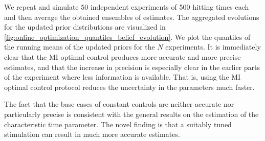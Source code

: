 We repeat and simulate $50$ independent experiments of 500 hitting times each and
then average the obtained ensembles of estimates.
The aggregated evolutions for the updated prior distributions are visualized in
\cref{fig:online_optimization_quantiles_belief_evolution}. We plot the
quantiles of the running means of the updated priors for the  $N$
experiments. It is immediately clear that the MI optimal control produces more accurate and
more precise estimates, and that the increase in precision is especially clear in the earlier parts of the
experiment where less information is available. That is, using the MI optimal
control protocol reduces the uncertainty in the parameters much faster.

The fact that the base cases of constant controls are neither accurate nor
particularly precise is consistent with the general results on the estimation of
the characteristic time parameter. The novel finding is that a
suitably tuned stimulation can result in much more accurate estimates.

 


